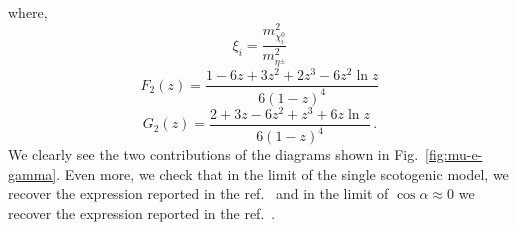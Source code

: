 \documentclass[12pt,letterpaper]{article}
\begin{document}
where,
\begin{equation}
\xi_i=\dfrac{ m_{\chi_i^0}^2 }{  m_{\eta^{\pm}}^2 }
\end{equation}
\begin{equation}
\label{eq:F2}
F_2(z)=\dfrac{1-6z+3z^2+2z^3-6z^2\ln{z}}{6(1-z)^4}
\end{equation}
\begin{equation}
\label{eq:G2}
G_2(z)=\dfrac{2+3z-6z^2+z^3+6z\ln{z}}{6(1-z)^4}\,.
\end{equation}
We clearly see the two contributions of the diagrams shown in Fig.~\ref{fig:mu-e-gamma}. Even more, we check that in the limit of the single scotogenic model, we recover the expression reported in the ref.~\cite{Ibarra:2016dlb} and in the limit of $\cos\alpha\approx 0$ we recover the expression reported in the ref.~\cite{Rocha-Moran:2016enp}.
\end{document}
